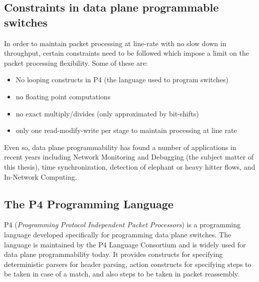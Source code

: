 \subsection{Constraints in data plane programmable switches}
In order to maintain packet processing at line-rate with no slow down in throughput, certain constraints need to be followed which impose a limit on the packet processing flexibility. Some of these are:
\begin{itemize}
  \item No looping constructs in P4\cite{p4} (the language used to program switches)
  \item no floating point computations
  \item no exact multiply/divides (only approximated by bit-shifts)
  \item only one read-modify-write per stage to maintain processing at line rate
\end{itemize}
Even so, data plane programmability has found a number of applications in recent years including Network Monitoring and Debugging (the subject matter of this thesis), time synchronization, detection 
of elephant or heavy hitter flows\cite{HH}, and In-Network Computing.
\subsection{The P4 Programming Language}

P4 (\textit{Programming Protocol Independent Packet Processors})\cite{p4} is a programming language developed specifically for programming data plane switches. The language is maintained by the P4 Language Consortium and is widely used for data plane programmability today. It provides constructs for specifying deterministic parsers for header parsing, action constructs for specifying steps to be taken in case of a match, and also steps to be taken in packet reassembly.



